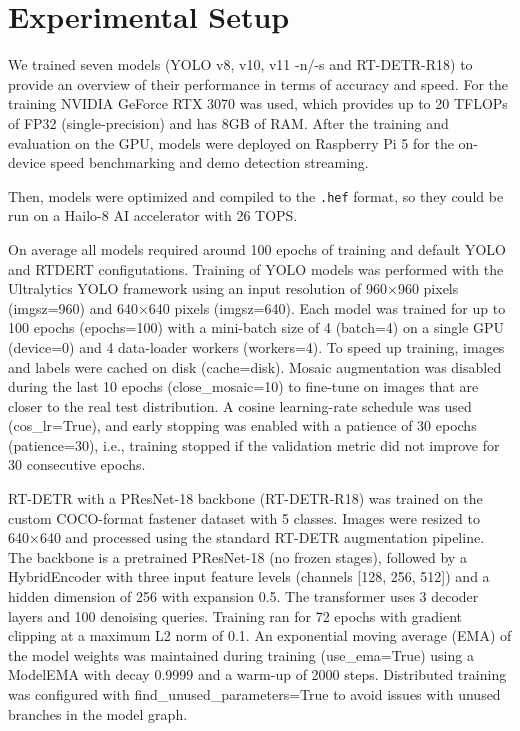 \documentclass[12pt,a4paper]{report}
\begin{document}
\section{Experimental Setup}

We trained seven models (YOLO v8, v10, v11 -n/-s and RT-DETR-R18) to provide
an overview of their performance in terms of accuracy and speed. For the training
NVIDIA GeForce RTX 3070 was used, which provides up to 20 TFLOPs of FP32 (single-precision)
and has 8GB of RAM.
After the training and evaluation on the GPU, models were deployed on Raspberry Pi 5
for the on-device speed benchmarking and demo detection streaming.

Then, models were optimized and compiled to the \texttt{.hef} format, so they could be run on a
Hailo-8 AI accelerator with 26 TOPS.

On average all models required around 100 epochs of training and default YOLO and RTDERT configutations.
Training of YOLO models was performed with the Ultralytics YOLO framework using an input resolution of
960×960 pixels (imgsz=960) and 640×640 pixels (imgsz=640). Each model was trained for up to 100 epochs
(epochs=100) with a mini-batch size of 4 (batch=4) on a single GPU (device=0) and 4 data-loader workers
(workers=4). To speed up training, images and labels were cached on disk (cache=disk). Mosaic augmentation
was disabled during the last 10 epochs (close\_mosaic=10) to fine-tune on images that are closer to the real
test distribution. A cosine learning-rate schedule was used (cos\_lr=True), and early stopping was enabled
with a patience of 30 epochs (patience=30), i.e., training stopped if the validation metric did not improve
for 30 consecutive epochs.

RT-DETR with a PResNet-18 backbone (RT-DETR-R18) was trained on the custom COCO-format fastener dataset with 5 classes.
Images were resized to 640×640 and processed using the standard RT-DETR augmentation pipeline. The backbone is a pretrained
PResNet-18 (no frozen stages), followed by a HybridEncoder with three input feature levels (channels [128, 256, 512])
and a hidden dimension of 256 with expansion 0.5. The transformer uses 3 decoder layers and 100 denoising queries.
Training ran for 72 epochs with gradient clipping at a maximum L2 norm of 0.1. An exponential moving average (EMA) of
the model weights was maintained during training (use\_ema=True) using a ModelEMA with decay 0.9999 and a warm-up of 2000
steps. Distributed training was configured with find\_unused\_parameters=True to avoid issues with unused branches
in the model graph.
\end{document}
